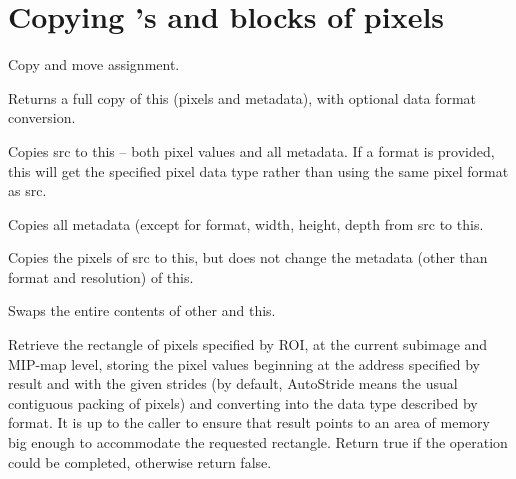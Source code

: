 \section{Copying \ImageBuf's and blocks of pixels}

Copy and move assignment.
\apiend

Returns a full copy of {\cf this} (pixels and metadata), with optional data
format conversion.
\apiend

Copies {\cf src} to {\cf this} -- both pixel values and all metadata.
If a {\cf format} is provided, {\cf this} will get the specified pixel
data type rather than using the same pixel format as {\cf src}.
\apiend

Copies all metadata (except for {\cf format}, {\cf width}, {\cf height},
{\cf depth} from {\cf src} to {\cf this}.
\apiend

Copies the pixels of {\cf src} to {\cf this}, but does not change the
metadata (other than format and resolution) of {\cf this}.
\apiend

Swaps the entire contents of {\cf other} and {\cf this}.
\apiend

Retrieve the rectangle of pixels specified by ROI, at the current subimage
and MIP-map level, storing the pixel values beginning at the address
specified by {\cf result} and with the given strides (by default, {\cf
AutoStride} means the usual contiguous packing of pixels) and converting
into the data type described by {\cf format}.  It is up to the caller to
ensure that {\cf result} points to an area of memory big enough to
accommodate the requested rectangle. Return {\cf true} if the operation
could be completed, otherwise return {\cf false}.
\apiend

